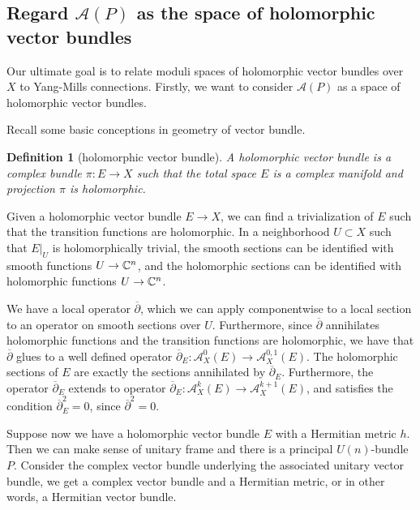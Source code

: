 \documentclass[11pt]{amsart}
\numberwithin{equation}{section}
\theoremstyle{plain}
\theoremstyle{plain}
\newtheorem{defnsub}[thmsub]{Definition}
\numberwithin{equation}{section}
\begin{document}
\subsection{Regard $\mathscr{A}(P)$ as the space of holomorphic vector bundles}
Our ultimate goal is to relate moduli spaces of holomorphic vector bundles over $X$ to Yang-Mills connections.  Firstly, we want to consider $\mathscr{A}(P)$ as a space of holomorphic vector bundles.

Recall some basic conceptions in geometry of vector bundle.
\begin{defnsub}[holomorphic vector bundle]
A holomorphic vector bundle is a complex bundle $\pi:E\to X$ such that the total space $E$ is a complex manifold and projection $\pi$ is holomorphic.
\end{defnsub}

Given a holomorphic vector bundle $E\to X$, we can find a trivialization of $E$ such that the transition functions are holomorphic. In a neighborhood $U\subset X$ such that $E|_U$ is holomorphically trivial, the smooth sections can be identified with smooth functions $U\to\Bbb{C}^n$, and the holomorphic sections can be identified with holomorphic functions $U\to\Bbb{C}^n$.

We have a local operator $\overline{\partial}$, which we can apply componentwise to a local section to an operator on smooth sections over $U$. Furthermore, since $\overline{\partial}$ annihilates holomorphic functions and the transition functions are holomorphic, we have that $\overline{\partial}$ glues to a well defined operator $\overline{\partial}_E:\mathcal{A}_X^0(E)\to\mathcal{A}_X^{0,1}(E)$. The holomorphic sections of $E$ are exactly the sections annihilated by $\overline{\partial}_E$. Furthermore, the operator $\overline{\partial}_E$ extends to operator $\overline{\partial}_E:\mathcal{A}_X^{k}(E)\to\mathcal{A}_{X}^{k+1}(E)$, and satisfies the condition $\overline{\partial}_E^2=0$, since $\overline{\partial}^2=0$. 

Suppose now we have a holomorphic vector bundle $E$ with a Hermitian metric $h$. Then we can make sense of unitary frame and there is a principal $U(n)$-bundle $P$. Consider the complex vector bundle underlying the associated unitary vector bundle, we get a complex vector bundle and a Hermitian metric, or in other words, a Hermitian vector bundle.
\end{document}
